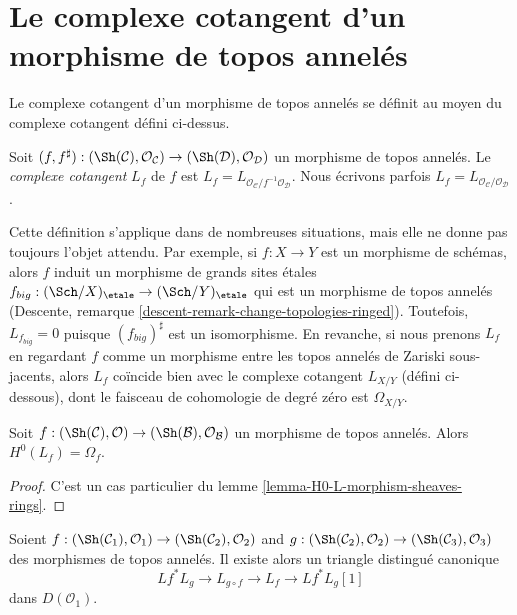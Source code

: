 \section{Le complexe cotangent d'un morphisme de topos annelés}
\label{section-cotangent-morphism-ringed-topoi}

\noindent
Le complexe cotangent d'un morphisme de topos annelés se définit au moyen du
complexe cotangent défini ci-dessus.

\begin{definition}
\label{definition-cotangent-complex-morphism-ringed-topoi}
Soit $(f, f^\sharp) : (\Sh(\mathcal{C}), \mathcal{O}_\mathcal{C}) \to
(\Sh(\mathcal{D}), \mathcal{O}_\mathcal{D})$ un morphisme de topos annelés.
Le {\it complexe cotangent} $L_f$ de $f$ est
$L_f = L_{\mathcal{O}_\mathcal{C}/f^{-1}\mathcal{O}_\mathcal{D}}$.
Nous écrivons parfois
$L_f = L_{\mathcal{O}_\mathcal{C}/\mathcal{O}_\mathcal{D}}$.
\end{definition}

\noindent
Cette définition s'applique dans de nombreuses situations, mais elle ne donne
pas toujours l'objet attendu. Par exemple, si $f : X \to Y$ est un morphisme
de schémas, alors $f$ induit un morphisme de grands sites étales
$f_{big} : (\Sch/X)_\etale \to (\Sch/Y)_\etale$
qui est un morphisme de topos annelés (Descente, remarque
\ref{descent-remark-change-topologies-ringed}). Toutefois,
$L_{f_{big}} = 0$ puisque $(f_{big})^\sharp$ est un isomorphisme. En revanche,
si nous prenons $L_f$ en regardant $f$ comme un morphisme entre les topos
annelés de Zariski sous-jacents, alors $L_f$ coïncide bien avec le complexe
cotangent $L_{X/Y}$ (défini ci-dessous), dont le faisceau de cohomologie de
degré zéro est $\Omega_{X/Y}$.

\begin{lemma}
\label{lemma-H0-L-morphism-ringed-topoi}
Soit $f : (\Sh(\mathcal{C}), \mathcal{O}) \to
(\Sh(\mathcal{B}), \mathcal{O}_\mathcal{B})$ un morphisme de topos annelés.
Alors $H^0(L_f) = \Omega_f$.
\end{lemma}

\begin{proof}
C'est un cas particulier du lemme \ref{lemma-H0-L-morphism-sheaves-rings}.
\end{proof}

\begin{lemma}
\label{lemma-triangle-ringed-topoi}
Soient $f : (\Sh(\mathcal{C}_1), \mathcal{O}_1) \to
(\Sh(\mathcal{C}_2), \mathcal{O}_2)$ and
$g : (\Sh(\mathcal{C}_2), \mathcal{O}_2) \to
(\Sh(\mathcal{C}_3), \mathcal{O}_3)$ des morphismes de topos annelés. Il
existe alors un triangle distingué canonique
$$
Lf^* L_g \to L_{g \circ f} \to L_f \to Lf^*L_g[1]
$$
dans $D(\mathcal{O}_1)$.
\end{lemma}

